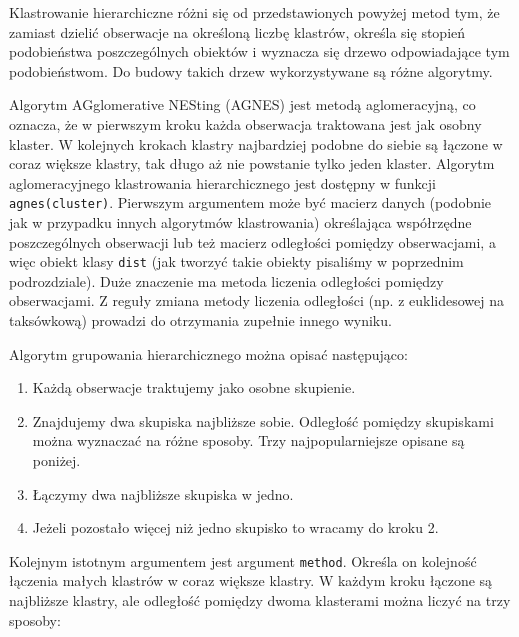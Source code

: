 \documentclass[polish,]{book}
\begin{document}
Klastrowanie hierarchiczne różni się od przedstawionych powyżej metod tym, że
zamiast dzielić obserwacje na określoną liczbę klastrów, określa się stopień podobieństwa poszczególnych obiektów i wyznacza się drzewo odpowiadające tym podobieństwom. Do budowy takich drzew wykorzystywane są różne algorytmy.

Algorytm AGglomerative NESting (AGNES) jest metodą aglomeracyjną, co oznacza, że w pierwszym kroku każda obserwacja traktowana jest jak osobny klaster.
W kolejnych krokach klastry najbardziej podobne do siebie są łączone w coraz większe klastry, tak długo aż nie powstanie tylko jeden klaster. Algorytm aglomeracyjnego klastrowania hierarchicznego jest dostępny w funkcji \texttt{agnes(cluster)}. Pierwszym argumentem może być macierz danych (podobnie jak w przypadku innych algorytmów klastrowania) określająca współrzędne poszczególnych obserwacji lub też
macierz odległości pomiędzy obserwacjami, a więc obiekt klasy \texttt{dist} (jak tworzyć
takie obiekty pisaliśmy w poprzednim podrozdziale). Duże znaczenie ma metoda
liczenia odległości pomiędzy obserwacjami. Z reguły zmiana metody liczenia odległości (np. z euklidesowej na taksówkową) prowadzi do otrzymania zupełnie innego wyniku.

Algorytm grupowania hierarchicznego można opisać następująco:

\begin{enumerate}
\def\labelenumi{\arabic{enumi}.}
\item
  Każdą obserwacje traktujemy jako osobne skupienie.
\item
  Znajdujemy dwa skupiska najbliższe sobie. Odległość pomiędzy skupiskami
  można wyznaczać na różne sposoby. Trzy najpopularniejsze opisane są poniżej.
\item
  Łączymy dwa najbliższe skupiska w jedno.
\item
  Jeżeli pozostało więcej niż jedno skupisko to wracamy do kroku 2.
\end{enumerate}

Kolejnym istotnym argumentem jest argument \texttt{method}. Określa on kolejność łączenia małych klastrów w coraz większe klastry. W każdym kroku łączone są najbliższe klastry, ale odległość pomiędzy dwoma klasterami można liczyć na trzy sposoby:
\end{document}
